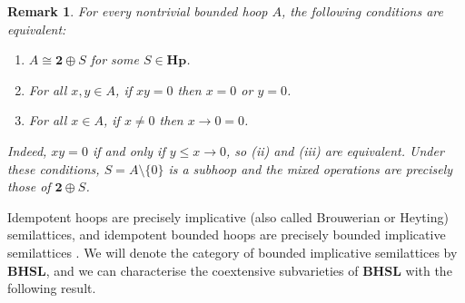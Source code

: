 \documentclass[11pt]{article}
\theoremstyle{pretty}
\theoremstyle{plainnote}
\newtheorem{remark}[theorem]{Remark}
\renewcommand{\2}{\mathbf{2}}
\newcommand{\Hoop}{\mathbf{Hp}}
\newcommand{\BoundedHeytingSemilattices}{\mathbf{BHSL}}
\begin{document}
\begin{remark}
    For every nontrivial bounded hoop $A$, the following conditions are equivalent:
    \begin{enumerate}[label=(\roman*)]
    \item $A\cong\2 \oplus S$ for some $S \in \Hoop$.
    \item For all $x, y \in A$, if $xy = 0$ then $x=0$ or $y=0$.
    \item For all $x \in A$, if $x \neq 0$ then $x \to 0 = 0$.
    \end{enumerate}
    Indeed, $xy=0$ if and only if $y\leqslant x\to0$, so (ii) and (iii) are equivalent. Under these conditions, $S=A\setminus\{0\}$ is a subhoop and the mixed operations are precisely those of $\2\oplus S$.
\end{remark}


Idempotent hoops are precisely implicative (also called Brouwerian or Heyting) semilattices, and idempotent bounded hoops are precisely bounded implicative semilattices \cite{BlokFerreirim2000StructureHoops}. We will denote the category of bounded implicative semilattices by $\BoundedHeytingSemilattices$, and we can characterise the coextensive subvarieties of $\BoundedHeytingSemilattices$ with the following result. 
\end{document}
